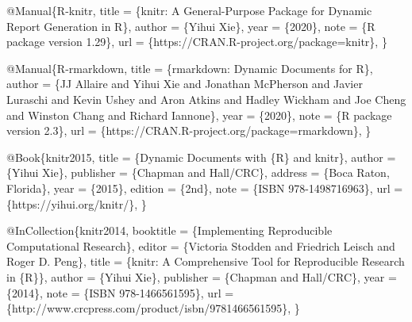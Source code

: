 \documentclass[
  11pt,
]{krantz}
\newenvironment{Shaded}{\begin{snugshade}}{\end{snugshade}}
\newcommand{\DataTypeTok}[1]{\textcolor[rgb]{0.27,0.27,0.27}{#1}}
\newcommand{\NormalTok}[1]{#1}
\newcommand{\OtherTok}[1]{\textcolor[rgb]{0.37,0.37,0.37}{#1}}
\newcommand{\VariableTok}[1]{\textcolor[rgb]{0,0,0}{#1}}
\begin{document}
\begin{Shaded}
\begin{Highlighting}[]
\VariableTok{@Manual}\NormalTok{\{}\OtherTok{R}\NormalTok{-}\OtherTok{knitr}\NormalTok{,}
  \DataTypeTok{title}\NormalTok{ = \{knitr: A General-Purpose Package for Dynamic Report}
\NormalTok{    Generation in R\},}
  \DataTypeTok{author}\NormalTok{ = \{Yihui Xie\},}
  \DataTypeTok{year}\NormalTok{ = \{2020\},}
  \DataTypeTok{note}\NormalTok{ = \{R package version 1.29\},}
  \DataTypeTok{url}\NormalTok{ = \{https://CRAN.R-project.org/package=knitr\},}
\NormalTok{\}}

\VariableTok{@Manual}\NormalTok{\{}\OtherTok{R}\NormalTok{-}\OtherTok{rmarkdown}\NormalTok{,}
  \DataTypeTok{title}\NormalTok{ = \{rmarkdown: Dynamic Documents for R\},}
  \DataTypeTok{author}\NormalTok{ = \{JJ Allaire and Yihui Xie and Jonathan McPherson}
\NormalTok{    and Javier Luraschi and Kevin Ushey and Aron Atkins and}
\NormalTok{    Hadley Wickham and Joe Cheng and Winston Chang and Richard}
\NormalTok{    Iannone\},}
  \DataTypeTok{year}\NormalTok{ = \{2020\},}
  \DataTypeTok{note}\NormalTok{ = \{R package version 2.3\},}
  \DataTypeTok{url}\NormalTok{ = \{https://CRAN.R-project.org/package=rmarkdown\},}
\NormalTok{\}}

\VariableTok{@Book}\NormalTok{\{}\OtherTok{knitr2015}\NormalTok{,}
  \DataTypeTok{title}\NormalTok{ = \{Dynamic Documents with \{R\} and knitr\},}
  \DataTypeTok{author}\NormalTok{ = \{Yihui Xie\},}
  \DataTypeTok{publisher}\NormalTok{ = \{Chapman and Hall/CRC\},}
  \DataTypeTok{address}\NormalTok{ = \{Boca Raton, Florida\},}
  \DataTypeTok{year}\NormalTok{ = \{2015\},}
  \DataTypeTok{edition}\NormalTok{ = \{2nd\},}
  \DataTypeTok{note}\NormalTok{ = \{ISBN 978-1498716963\},}
  \DataTypeTok{url}\NormalTok{ = \{https://yihui.org/knitr/\},}
\NormalTok{\}}

\VariableTok{@InCollection}\NormalTok{\{}\OtherTok{knitr2014}\NormalTok{,}
  \DataTypeTok{booktitle}\NormalTok{ = \{Implementing Reproducible Computational}
\NormalTok{    Research\},}
  \DataTypeTok{editor}\NormalTok{ = \{Victoria Stodden and Friedrich Leisch and Roger D.}
\NormalTok{    Peng\},}
  \DataTypeTok{title}\NormalTok{ = \{knitr: A Comprehensive Tool for Reproducible}
\NormalTok{    Research in \{R\}\},}
  \DataTypeTok{author}\NormalTok{ = \{Yihui Xie\},}
  \DataTypeTok{publisher}\NormalTok{ = \{Chapman and Hall/CRC\},}
  \DataTypeTok{year}\NormalTok{ = \{2014\},}
  \DataTypeTok{note}\NormalTok{ = \{ISBN 978-1466561595\},}
  \DataTypeTok{url}\NormalTok{ = \{http://www.crcpress.com/product/isbn/9781466561595\},}
\NormalTok{\}}


\end{Highlighting}
\end{Shaded}
\end{document}
